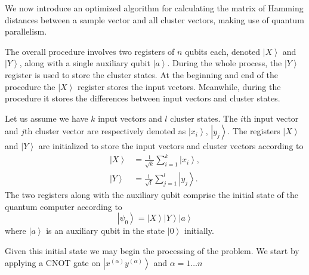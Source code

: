 \documentclass[pra,showkeys,twocolumn,showpacs]{revtex4-1}
\begin{document}
We now introduce an optimized algorithm for calculating the matrix of Hamming distances \cite{trugenberger2001} between a sample vector and all cluster vectors, making use of quantum parallelism.  


The overall procedure involves two registers of $n$ qubits each, denoted $\left| X \right\rangle$ and $\left| Y \right\rangle$, along with a single auxiliary qubit $\left| a \right\rangle$. 
During the whole process, the $\left| Y \right\rangle$ register is used to store the cluster states.  
At the beginning and end of the procedure the $\left| X \right\rangle$ register stores the input vectors.  
Meanwhile, during the procedure it stores the differences between input vectors and cluster states.

Let us assume we have $k$ input vectors and $l$ cluster states. 
The $i$th input vector and $j$th cluster vector are respectively denoted as $\left| x_i \right\rangle$, $\left| y_j \right\rangle$. 
The registers $\left| X \right\rangle$ and $\left| Y \right\rangle$ are initialized to store the input vectors and cluster vectors according to
%
\begin{align}
    \left| X \right\rangle  & = \frac{1}{\sqrt{k}} \sum\limits_{i=1}^{k} \left| x_i \right\rangle,  \\
    \left| Y \right\rangle&  = \frac{1}{\sqrt{l}} \sum\limits_{j=1}^{l} \left| y_j \right\rangle .
    \label{eq:encodnig}
\end{align}
% 
The two registers along with the auxiliary qubit comprise the initial state of the quantum computer according to
%
\begin{equation} 
\left| \psi_0 \right\rangle = 
    \left| X \right\rangle
    \left| Y \right\rangle 
    \left| a \right\rangle
    \label{eq:initial_state}
\end{equation}
%
where $\left| a \right\rangle$ is an auxiliary qubit in the state $\left| 0 \right\rangle$ initially.

Given this initial state we may begin the processing of the problem. We start by applying a CNOT gate on $\left| x^{(\alpha)} y^{(\alpha)} \right\rangle$ and $\alpha = 1 \dots n$
\end{document}
